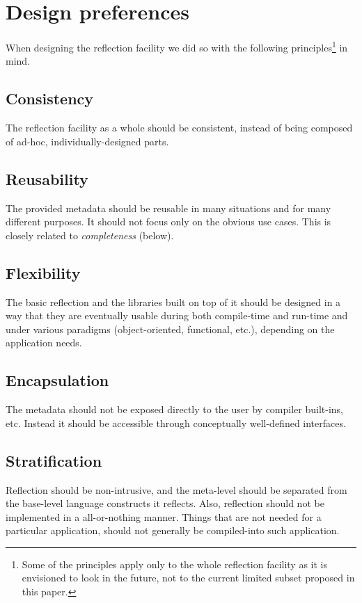 \section{Design preferences}

When designing the reflection facility we did so with
the following principles\footnote{Some of the principles
apply only to the whole reflection facility as it is envisioned
to look in the future, not to the current limited subset proposed
in this paper.} in mind.

\subsection{Consistency}

The reflection facility as a whole
should be consistent, instead of being composed of ad-hoc,
individually-designed parts.

\subsection{Reusability}

The provided metadata should be reusable
in many situations and for many different purposes. It should not focus only
on the obvious use cases. This is closely related to {\em completeness} (below).

\subsection{Flexibility}

The basic reflection and the libraries
built on top of it should be designed
in a way that they are eventually usable during both compile-time
and run-time and under various paradigms (object-oriented, functional, etc.),
depending on the application needs.

\subsection{Encapsulation}

The metadata should not be exposed directly to the user by compiler built-ins, etc.
Instead it should be accessible through conceptually well-defined interfaces.

\subsection{Stratification}

Reflection should be non-intrusive,
and the meta-level should be separated from the base-level language
constructs it reflects. Also, reflection should not be implemented
in a all-or-nothing manner. Things that are not needed for a particular application,
should not generally be compiled-into such application.

